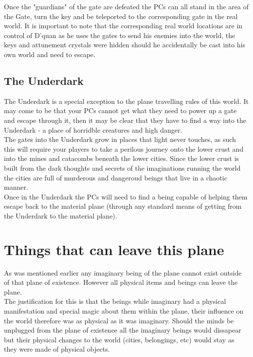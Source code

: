 \documentclass[10pt,twoside,twocolumn]{article}
\begin{document}
Once the "guardians" of the gate are defeated the PCs can all stand in the area of the Gate, turn the key and be teleported to the corresponding gate in the real world. It is important to note that the corresponding real world locations are in control of D'quan as he uses the gates to send his enemies into the world, the keys and attunement crystals were hidden should he accidentally be cast into his own world and need to escape.\\

\subsection{The Underdark}
The Underdark is a special exception to the plane travelling rules of this world. It may come to be that your PCs cannot get what they need to power up a gate and escape through it, then it may be clear that they have to find a way into the Underdark - a place of horridble creatures and high danger.\\

The gates into the Underdark grow in places that light never touches, as such this will require your players to take a perilous journey onto the lower crust and into the mines and catacombs beneath the lower cities. Since the lower crust is built from the dark thoughts and secrets of the imaginations running the world the cities are full of murderous and dangeroud beings that live in a chaotic manner.\\

Once in the Underdark the PCs will need to find a being capable of helping them escape back to the material plane (through any standard means of getting from the Underdark to the material plane).\\

\section{Things that can leave this plane}
As was mentioned earlier any imaginary being of the plane cannot exist outside of that plane of existence. However all physical items and beings can leave the plane.\\

The justification for this is that the beings while imaginary had a physical manifestation and special magic about them within the plane, their influence on the world therefore was as physical as it was imaginary. Should the minds be unplugged from the plane of existence all the imaginary beings would dissapear but their physical changes to the world (cities, belongings, etc) would stay as they were made of physical objects.\\
\end{document}
